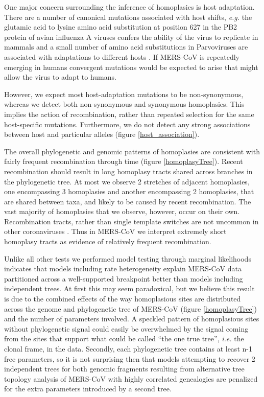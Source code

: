 \documentclass[11pt,oneside,letterpaper]{article}
\begin{document}
One major concern surrounding the inference of homoplasies is host adaptation.
There are a number of canonical mutations associated with host shifts, \textit{e.g.} the glutamic acid to lysine amino acid substitution at position 627 in the PB2 protein of avian influenza A viruses confers the ability of the virus to replicate in mammals \citep{subbarao_1993} and a small number of amino acid substitutions in Parvoviruses are associated with adaptations to different hosts \citep{chang_1992}.
If MERS-CoV is repeatedly emerging in humans convergent mutations would be expected to arise that might allow the virus to adapt to humans.

However, we expect most host-adaptation mutations to be non-synonymous, whereas we detect both non-synonymous and synonymous homoplasies.
This implies the action of recombination, rather than repeated selection for the same host-specific mutations.
Furthermore, we do not detect any strong associations between host and particular alleles (figure \ref{host_association}).

The overall phylogenetic and genomic patterns of homoplasies are consistent with fairly frequent recombination through time (figure \ref{homoplasyTree}).
Recent recombination should result in long homoplasy tracts shared across branches in the phylogenetic tree.
At most we observe 2 stretches of adjacent homoplasies, one encompassing 3 homoplasies and another encompassing 2 homoplasies, that are shared between taxa, and likely to be caused by recent recombination.
The vast majority of homoplasies that we observe, however, occur on their own.
Recombination tracts, rather than single template switches are not uncommon in other coronaviruses \citep{keck_1988,kottier_1995,herrewegh_1998}.
Thus in MERS-CoV we interpret extremely short homoplasy tracts as evidence of relatively frequent recombination.

Unlike all other tests we performed model testing through marginal likelihoods indicates that models including rate heterogeneity explain MERS-CoV data partitioned across a well-supported breakpoint better than models including independent trees.
At first this may seem paradoxical, but we believe this result is due to the combined effects of the way homoplasious sites are distributed across the genome and phylogenetic tree of MERS-CoV (figure \ref{homoplasyTree}) and the number of parameters involved.
A speckled pattern of homoplasious sites without phylogenetic signal could easily be overwhelmed by the signal coming from the sites that support what could be called ``the one true tree'', \textit{i.e.} the clonal frame, in the data.
Secondly, each phylogenetic tree contains at least n-1 free parameters, so it is not surprising then that models attempting to recover 2 independent trees for both genomic fragments resulting from alternative tree topology analysis of MERS-CoV with highly correlated genealogies are penalized for the extra parameters introduced by a second tree.
\end{document}
